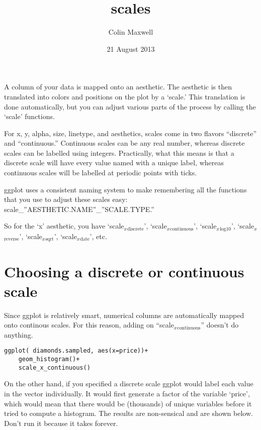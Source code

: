 \documentclass[11pt]{article}
\title{scales}
\author{Colin Maxwell}
\date{21 August 2013}
\begin{document}
\maketitle

\setcounter{tocdepth}{3}
\tableofcontents
\vspace*{1cm}

A column of your data is mapped onto an aesthetic. The aesthetic is
then translated into colors and positions on the plot by a `scale.'
This translation is done automatically, but you can adjust various
parts of the process by calling the `scale' functions.

For x, y, alpha, size, linetype, and aesthetics, scales come in two
flavors ``discrete'' and ``continuous.'' Continuous scales can be any real
number, whereas discrete scales can be labelled using
integers. Practically, what this means is that a discrete scale will
have every value named with a unique label, whereas continuous scales
will be labelled at periodic points with ticks.

ggplot uses a consistent naming system to make remembering all the functions
that you use to adjust these scales easy: scale_''AESTHETIC.NAME''_''SCALE.TYPE.''

So for the `x' aesthetic, you have
`scale$_x$$_{\mathrm{discrete}}$', `scale$_x$$_{\mathrm{continuous}}$', `scale$_x$$_{\mathrm{log10}}$',
`scale$_x$$_{\mathrm{reverse}}$', `scale$_x$$_{\mathrm{sqrt}}$', `scale$_x$$_{\mathrm{date}}$', etc.

\section{Choosing a discrete or continuous scale}
\label{sec-1}


Since ggplot is relatively smart, numerical columns are automatically
mapped onto continous scales. For this reason, adding on
``scale$_x$$_{\mathrm{continuous}}$'' doesn't do anything. 

\begin{verbatim}
ggplot( diamonds.sampled, aes(x=price))+
    geom_histogram()+
    scale_x_continuous()
\end{verbatim}


On the other hand, if you specified a discrete scale ggplot would
label each value in the vector individually. It would first generate a
factor of the variable `price', which would mean that there would be
(thousands) of unique variables before it tried to compute a
histogram. The results are non-sensical and are shown below. Don't run
it because it takes forever.
\end{document}
